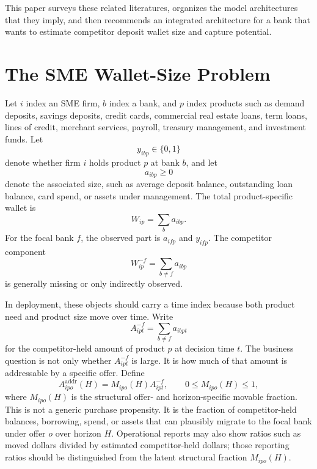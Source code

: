 \documentclass[11pt]{article}
\begin{document}
This paper surveys these related literatures, organizes the model architectures
that they imply, and then recommends an integrated architecture for a bank that
wants to estimate competitor deposit wallet size and capture potential.

\section{The SME Wallet-Size Problem}

Let $i$ index an SME firm, $b$ index a bank, and $p$ index products such as
demand deposits, savings deposits, credit cards, commercial real estate loans,
term loans, lines of credit, merchant services, payroll, treasury management,
and investment funds.
Let
\[
  y_{ibp} \in \{0,1\}
\]
denote whether firm $i$ holds product $p$ at bank $b$, and let
\[
  a_{ibp} \geq 0
\]
denote the associated size, such as average deposit balance, outstanding loan
balance, card spend, or assets under management. The total product-specific
wallet is
\[
  W_{ip} = \sum_b a_{ibp}.
\]
For the focal bank $f$, the observed part is $a_{ifp}$ and $y_{ifp}$. The
competitor component
\[
  W_{ip}^{-f} = \sum_{b \neq f} a_{ibp}
\]
is generally missing or only indirectly observed.

In deployment, these objects should carry a time index because both product
need and product size move over time. Write
\[
  A_{ipt}^{-f}=\sum_{b\neq f}a_{ibpt}
\]
for the competitor-held amount of product $p$ at decision time $t$. The
business question is not only whether $A_{ipt}^{-f}$ is large. It is how much of
that amount is addressable by a specific offer. Define
\[
  A_{ipo}^{\mathrm{addr}}(H)
  =
  M_{ipo}(H)A_{ipt}^{-f},
  \qquad 0\leq M_{ipo}(H)\leq 1,
\]
where $M_{ipo}(H)$ is the structural offer- and horizon-specific movable
fraction. This is not a generic purchase propensity. It is the fraction of
competitor-held balances, borrowing, spend, or assets that can plausibly
migrate to the focal bank under offer $o$ over horizon $H$. Operational reports
may also show ratios such as moved dollars divided by estimated
competitor-held dollars; those reporting ratios should be distinguished from
the latent structural fraction $M_{ipo}(H)$.
\end{document}
